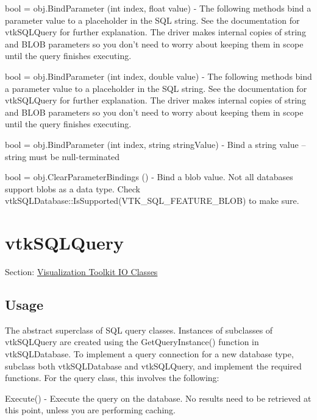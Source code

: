 \begin{DoxyItemize}
\item {\ttfamily bool = obj.\-Bind\-Parameter (int index, float value)} -\/ The following methods bind a parameter value to a placeholder in the S\-Q\-L string. See the documentation for vtk\-S\-Q\-L\-Query for further explanation. The driver makes internal copies of string and B\-L\-O\-B parameters so you don't need to worry about keeping them in scope until the query finishes executing.  
\item {\ttfamily bool = obj.\-Bind\-Parameter (int index, double value)} -\/ The following methods bind a parameter value to a placeholder in the S\-Q\-L string. See the documentation for vtk\-S\-Q\-L\-Query for further explanation. The driver makes internal copies of string and B\-L\-O\-B parameters so you don't need to worry about keeping them in scope until the query finishes executing.  
\item {\ttfamily bool = obj.\-Bind\-Parameter (int index, string string\-Value)} -\/ Bind a string value -- string must be null-\/terminated  
\item {\ttfamily bool = obj.\-Clear\-Parameter\-Bindings ()} -\/ Bind a blob value. Not all databases support blobs as a data type. Check vtk\-S\-Q\-L\-Database\-::\-Is\-Supported(\-V\-T\-K\-\_\-\-S\-Q\-L\-\_\-\-F\-E\-A\-T\-U\-R\-E\-\_\-\-B\-L\-O\-B) to make sure.  
\end{DoxyItemize}\hypertarget{vtkio_vtksqlquery}{}\section{vtk\-S\-Q\-L\-Query}\label{vtkio_vtksqlquery}
Section\-: \hyperlink{sec_vtkio}{Visualization Toolkit I\-O Classes} \hypertarget{vtkwidgets_vtkxyplotwidget_Usage}{}\subsection{Usage}\label{vtkwidgets_vtkxyplotwidget_Usage}
The abstract superclass of S\-Q\-L query classes. Instances of subclasses of vtk\-S\-Q\-L\-Query are created using the Get\-Query\-Instance() function in vtk\-S\-Q\-L\-Database. To implement a query connection for a new database type, subclass both vtk\-S\-Q\-L\-Database and vtk\-S\-Q\-L\-Query, and implement the required functions. For the query class, this involves the following\-:

Execute() -\/ Execute the query on the database. No results need to be retrieved at this point, unless you are performing caching.

